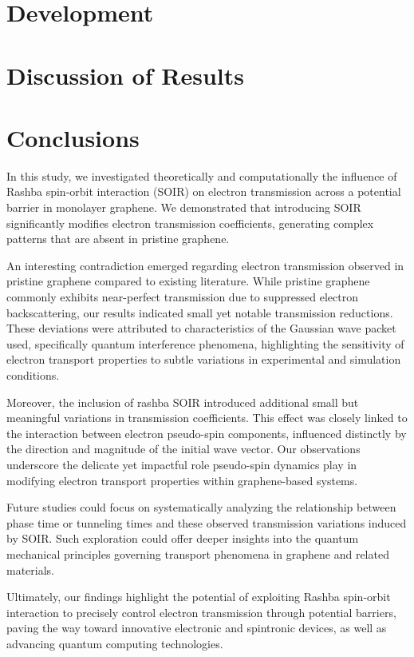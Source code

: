 \documentclass[twocolumn, aps, prb, 10pt]{revtex4-2}
\begin{document}
    \section{Development}\label{sec:development}
    

    \section{Discussion of Results}\label{sec:discussion-of-results}
    

    \section{Conclusions}\label{sec:conclusions}

    In this study, we investigated theoretically and computationally the influence of Rashba spin-orbit interaction (SOIR) on electron transmission across a potential barrier in monolayer graphene.
    We demonstrated that introducing SOIR significantly modifies electron transmission coefficients, generating complex patterns that are absent in pristine graphene.

    An interesting contradiction emerged regarding electron transmission observed in pristine graphene compared to existing literature.
    While pristine graphene commonly exhibits near-perfect transmission due to suppressed electron backscattering, our results indicated small yet notable transmission reductions.
    These deviations were attributed to characteristics of the Gaussian wave packet used, specifically quantum interference phenomena, highlighting the sensitivity of electron transport properties to subtle variations in experimental and simulation conditions.

    Moreover, the inclusion of rashba SOIR introduced additional small but meaningful variations in transmission coefficients.
    This effect was closely linked to the interaction between electron pseudo-spin components, influenced distinctly by the direction and magnitude of the initial wave vector.
    Our observations underscore the delicate yet impactful role pseudo-spin dynamics play in modifying electron transport properties within graphene-based systems.

    Future studies could focus on systematically analyzing the relationship between phase time or tunneling times and these observed transmission variations induced by SOIR. Such exploration could offer deeper insights into the quantum mechanical principles governing transport phenomena in graphene and related materials.

    Ultimately, our findings highlight the potential of exploiting Rashba spin-orbit interaction to precisely control electron transmission through potential barriers, paving the way toward innovative electronic and spintronic devices, as well as advancing quantum computing technologies.



    
    
\end{document}
